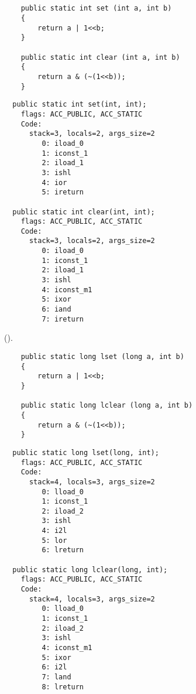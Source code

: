 \subsection{}


\begin{lstlisting}
	public static int set (int a, int b) 
	{
		return a | 1<<b;
	}

	public static int clear (int a, int b) 
	{
		return a & (~(1<<b));
	}
\end{lstlisting}

\begin{lstlisting}
  public static int set(int, int);
    flags: ACC_PUBLIC, ACC_STATIC
    Code:
      stack=3, locals=2, args_size=2
         0: iload_0       
         1: iconst_1      
         2: iload_1       
         3: ishl          
         4: ior           
         5: ireturn       

  public static int clear(int, int);
    flags: ACC_PUBLIC, ACC_STATIC
    Code:
      stack=3, locals=2, args_size=2
         0: iload_0       
         1: iconst_1      
         2: iload_1       
         3: ishl          
         4: iconst_m1     
         5: ixor          
         6: iand          
         7: ireturn       
\end{lstlisting}

 ().


\begin{lstlisting}
	public static long lset (long a, int b) 
	{
		return a | 1<<b;
	}

	public static long lclear (long a, int b) 
	{
		return a & (~(1<<b));
	}
\end{lstlisting}

\begin{lstlisting}
  public static long lset(long, int);
    flags: ACC_PUBLIC, ACC_STATIC
    Code:
      stack=4, locals=3, args_size=2
         0: lload_0       
         1: iconst_1      
         2: iload_2       
         3: ishl          
         4: i2l           
         5: lor           
         6: lreturn       

  public static long lclear(long, int);
    flags: ACC_PUBLIC, ACC_STATIC
    Code:
      stack=4, locals=3, args_size=2
         0: lload_0       
         1: iconst_1      
         2: iload_2       
         3: ishl          
         4: iconst_m1     
         5: ixor          
         6: i2l           
         7: land          
         8: lreturn       
\end{lstlisting}

